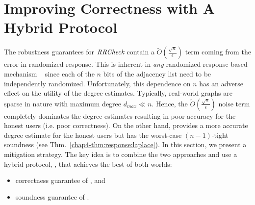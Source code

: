 \section{Improving Correctness with A Hybrid Protocol}\label{chap4-sec:hybrid}
The robustness guarantees for $\textit{RRCheck}{}$ contain a $\tilde{O}(\frac{\sqrt{n}}{\epsilon})$ term coming from the error in randomized response.
This is inherent in \textit{any} randomized response based mechanism  ~\cite{error1,error2,Duchi_FOCS13} since each of the $n$ bits of the adjacency list need to be independently randomized. Unfortunately, this dependence on $n$ has an adverse effect on the utility of the degree estimates. Typically, real-world graphs are sparse in nature with maximum degree $d_{max}\ll n$. Hence, the $\tilde{O}(\frac{\sqrt{n}}{\epsilon})$ noise term completely dominates the degree estimates resulting in poor accuracy for the honest users %
(i.e. poor correctness). On the other hand, \RLap{} provides a more accurate degree estimate for the honest users but has the worst-case $(n-1)$-tight soundness (see Thm.~\ref{chap4-thm:response:laplace}). In this section, we present a mitigation strategy. The key idea is to combine the two approaches and use a hybrid protocol, \DegHybrid, that achieves the best of both worlds: 
\begin{itemize} \item correctness guarantee of \RLap, and \item soundness guarantee of \DegRRCheck. \end{itemize}

